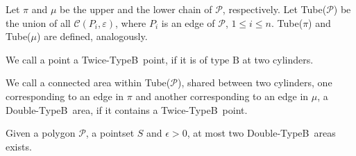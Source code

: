 \documentclass[a4paper,UKenglish]{lipics}
\newcommand{\eps}{\varepsilon}
\newcommand{\CC}{{\mathscr C}}
\newcommand{\Pol}{{\mathscr P}}
\newcommand{\PolSeg}{{P}}
\newcommand{\DoubleB}{Double-TypeB}
\newcommand{\pset}{S}
\newcommand{\SemiBad}{\mbox{type B}}
\begin{document}
\newcommand{\TwiceB}{Twice-TypeB}
\newcommand{\Upper}{\pi}
\newcommand{\Lower}{\mu}



































\newcommand{\Rival}{Rival}

Let $\Upper$ and $\Lower$ be the upper 
and the lower chain of $\Pol$, respectively.  
Let Tube($\Pol$) be the union of all $\CC(\PolSeg_i, \eps)$, 
where $P_i$ is an edge of $\Pol$, $1 \le i \le n$.
Tube($\Upper$) and Tube($\Lower$) are defined, analogously.


\begin{definition}
We call a point a  \TwiceB ~point, 
if it is of $\SemiBad$ at two cylinders.
\end{definition}

\begin{definition}

We call a connected area within Tube($\Pol$),
shared between two cylinders, one corresponding 
to an edge in $\Upper$ and another corresponding to 
an edge in $\Lower$, a \DoubleB~area, 
if it contains a \TwiceB ~point. 
\end{definition}


\begin{lemma}\label{lemma:twice}
Given a polygon $\Pol$, a pointset $\pset$ 
and $\epsilon>0$, at most two \DoubleB~areas  exists.  
\end{lemma}
\end{document}
